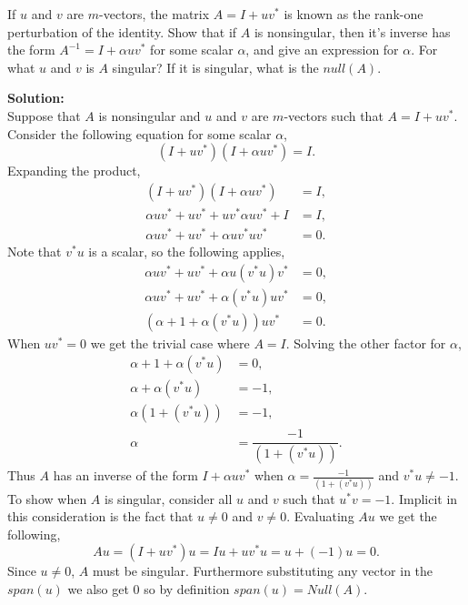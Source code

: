 \documentclass[12pt]{article}
\makeatletter
\theoremstyle{homework}
\newenvironment{exercise}[1]
{\def\@currentlabel{#1}\exercisecore}
{\endexercisecore}
\newcommand{\localhead}[1]{\par\smallskip\noindent\textbf{#1}\nobreak\\}%
\newcommand\solution{\localhead{Solution:}}
\makeatother
\begin{document}
\begin{exercise}{2.6} If $u$ and $v$ are $m$-vectors, the matrix $A = I + uv^*$ is known as the 
  rank-one perturbation of the identity. Show that if $A$ is nonsingular, then it's inverse has the form 
  $A^{-1} = I + \alpha uv^*$ for some scalar $\alpha$, and give an expression for $\alpha$. For what 
  $u$ and $v$ is $A$ singular? If it is singular, what is the $null(A)$.\\

  \solution Suppose that $A$ is nonsingular and $u$ and $v$ are $m$-vectors such that $A = I + uv^*$. 
  Consider the following equation for some scalar $\alpha$, 
  \begin{equation*}
    (I + uv^*)(I + \alpha uv^*) = I.
  \end{equation*}
  Expanding the product, 
  \begin{align*}
    (I + uv^*)(I + \alpha uv^*) &= I,\\
    \alpha uv^* + uv^* + uv^*\alpha uv^* + I &= I,\\
    \alpha uv^* + uv^* + \alpha uv^*uv^* &= 0.
  \end{align*}
  Note that $v^*u$ is a scalar, so the following applies,
  \begin{align*}
    \alpha uv^* + uv^* + \alpha u(v^*u)v^* &= 0,\\
    \alpha uv^* + uv^* + \alpha (v^*u)uv^* &= 0,\\
    (\alpha + 1 + \alpha (v^*u))uv^* &= 0.
  \end{align*}
  When $uv^* = 0$ we get the trivial case where $A = I$. Solving the other factor for $\alpha$,
  \begin{align*}
    \alpha + 1 + \alpha (v^*u) &= 0,\\
    \alpha + \alpha (v^*u) &= -1,\\
    \alpha (1+ (v^*u)) &= -1,\\
    \alpha &= \dfrac{-1}{(1+ (v^*u))}.
  \end{align*}
  Thus $A$ has an inverse of the form $I + \alpha uv^*$ when $\alpha = \frac{-1}{(1+ (v^*u))}$ and $v^*u \neq -1$.\\

  To show when $A$ is singular, consider all $u$ and $v$ such that $u^*v = -1$. Implicit in this
  consideration is the fact that $u \neq 0$ and $v \neq 0$. Evaluating $Au$ we get the following, 
  \begin{equation*}
    Au = (I + uv^*)u =  Iu + uv^*u = u + (-1)u = 0.
  \end{equation*}
  Since $u \neq 0$, $A$ must be singular. Furthermore substituting any vector in the $span(u)$
  we also get 0 so by definition $span(u) = Null(A)$.
\end{exercise}
\vspace{.25in}
\end{document}
